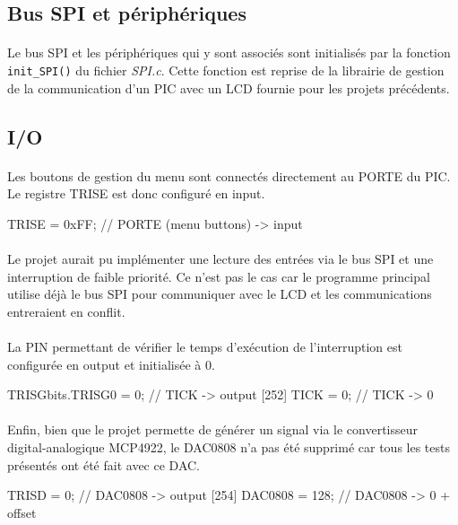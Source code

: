 \documentclass{article}
\begin{document}
    \subsection{Bus SPI et périphériques}
    \paragraph{}
    Le bus SPI et les périphériques qui y sont associés sont initialisés par la fonction \texttt{init\_SPI()} du fichier \emph{SPI.c}. Cette fonction est reprise de la librairie de gestion de la communication d'un PIC avec un LCD fournie pour les projets précédents.

    \subsection{I/O}
    \paragraph{}
    Les boutons de gestion du menu sont connectés directement au PORTE du PIC. Le registre TRISE est donc configuré en input.
    \begin{verbatimtab}
    [250]    TRISE   = 0xFF;         // PORTE (menu buttons) -> input
    \end{verbatimtab}

    \paragraph{}
    Le projet aurait pu implémenter une lecture des entrées via le bus SPI et une interruption de faible priorité. Ce n'est pas le cas car le programme principal utilise déjà le bus SPI pour communiquer avec le LCD et les communications entreraient en conflit.

    \paragraph{}
    La PIN permettant de vérifier le temps d'exécution de l'interruption est configurée en output et initialisée à 0.
    \begin{verbatimtab}
    [251]    TRISGbits.TRISG0 = 0;   // TICK -> output
    [252]    TICK    = 0;            // TICK -> 0
    \end{verbatimtab}

    \paragraph{}
    Enfin, bien que le projet permette de générer un signal via le convertisseur digital-analogique MCP4922, le DAC0808 n'a pas été supprimé car tous les tests présentés ont été fait avec ce DAC.
    \begin{verbatimtab}
    [253]    TRISD   = 0;            // DAC0808 -> output
    [254]    DAC0808 = 128;          // DAC0808 -> 0 + offset
    \end{verbatimtab}
\end{document}
